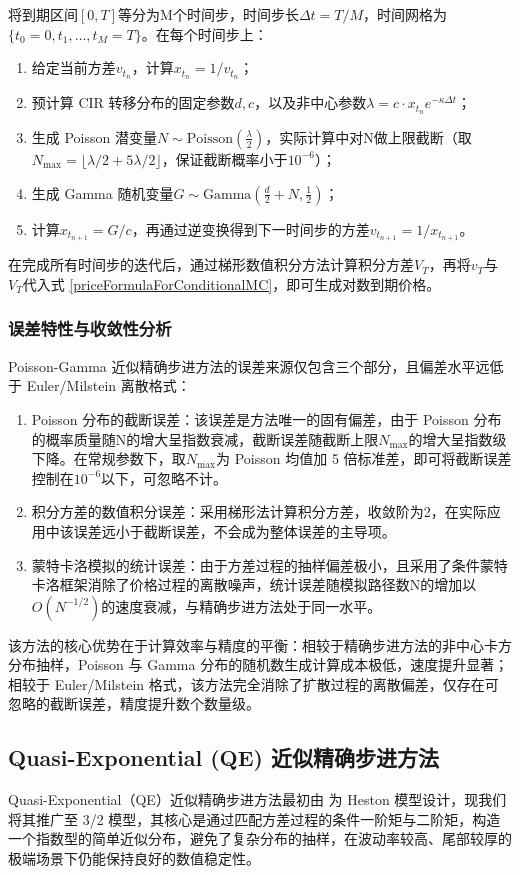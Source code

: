 将到期区间$[0,T]$等分为M个时间步，时间步长$\Delta t=T/M$，时间网格为$\{t_0=0,t_1,\ldots,t_M=T\}$。在每个时间步上：
\begin{enumerate}
  \item 给定当前方差$v_{t_n}$，计算$x_{t_n} = 1/v_{t_n}$；
  \item 预计算 CIR 转移分布的固定参数$d,c$，以及非中心参数$\lambda=c\cdot x_{t_n} e^{-\kappa \Delta t}$；
  \item 生成 Poisson 潜变量$N\sim \text {Poisson}\left( \frac {\lambda}{2} \right)$，实际计算中对N做上限截断（取$N_{\max}​=⌊λ/2+5λ/2​⌋$，保证截断概率小于$10^{-6}$）；
  \item 生成 Gamma 随机变量$G\sim \text {Gamma}\left( \frac {d}{2} + N, \frac {1}{2} \right)$；
  \item 计算$x_{t_{n+1}} = G/c$，再通过逆变换得到下一时间步的方差$v_{t_{n+1}} = 1/x_{t_{n+1}}$。
\end{enumerate}
在完成所有时间步的迭代后，通过梯形数值积分方法计算积分方差$V_T$，再将$v_T$与$V_T$代入式 \eqref{priceFormulaForConditionalMC}，即可生成对数到期价格。

\subsubsection{误差特性与收敛性分析}
Poisson-Gamma 近似精确步进方法的误差来源仅包含三个部分，且偏差水平远低于 Euler/Milstein 离散格式：
\begin{enumerate}
  \item Poisson 分布的截断误差：该误差是方法唯一的固有偏差，由于 Poisson 分布的概率质量随N的增大呈指数衰减，截断误差随截断上限$N_{\max}$​的增大呈指数级下降。在常规参数下，取$N_{\max}$​为 Poisson 均值加 5 倍标准差，即可将截断误差控制在$10^{−6}$以下，可忽略不计。
  \item 积分方差的数值积分误差：采用梯形法计算积分方差，收敛阶为2，在实际应用中该误差远小于截断误差，不会成为整体误差的主导项。
  \item 蒙特卡洛模拟的统计误差：由于方差过程的抽样偏差极小，且采用了条件蒙特卡洛框架消除了价格过程的离散噪声，统计误差随模拟路径数N的增加以$O(N^{-1/2})$的速度衰减，与精确步进方法处于同一水平。
\end{enumerate}
该方法的核心优势在于计算效率与精度的平衡：相较于精确步进方法的非中心卡方分布抽样，Poisson 与 Gamma 分布的随机数生成计算成本极低，速度提升显著；相较于 Euler/Milstein 格式，该方法完全消除了扩散过程的离散偏差，仅存在可忽略的截断误差，精度提升数个数量级。

\subsection{Quasi-Exponential (QE) 近似精确步进方法}
Quasi-Exponential（QE）近似精确步进方法最初由 \citet{andersenEfficientSimulationHeston2007} 为 Heston 模型设计，现我们将其推广至 3/2 模型，其核心是通过匹配方差过程的条件一阶矩与二阶矩，构造一个指数型的简单近似分布，避免了复杂分布的抽样，在波动率较高、尾部较厚的极端场景下仍能保持良好的数值稳定性。
